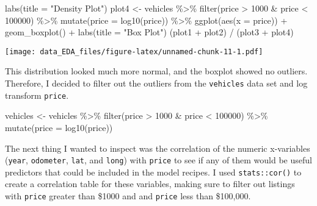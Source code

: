 \documentclass[
]{article}
\newenvironment{Shaded}{\begin{snugshade}}{\end{snugshade}}
\newcommand{\AttributeTok}[1]{\textcolor[rgb]{0.77,0.63,0.00}{#1}}
\newcommand{\DecValTok}[1]{\textcolor[rgb]{0.00,0.00,0.81}{#1}}
\newcommand{\FunctionTok}[1]{\textcolor[rgb]{0.00,0.00,0.00}{#1}}
\newcommand{\NormalTok}[1]{#1}
\newcommand{\OtherTok}[1]{\textcolor[rgb]{0.56,0.35,0.01}{#1}}
\newcommand{\SpecialCharTok}[1]{\textcolor[rgb]{0.00,0.00,0.00}{#1}}
\newcommand{\StringTok}[1]{\textcolor[rgb]{0.31,0.60,0.02}{#1}}
\begin{document}
\begin{Shaded}
\begin{Highlighting}[]
  \FunctionTok{labs}\NormalTok{(}\AttributeTok{title =} \StringTok{"Density Plot"}\NormalTok{)}
\NormalTok{plot4 }\OtherTok{\textless{}{-}}\NormalTok{ vehicles }\SpecialCharTok{\%\textgreater{}\%} 
  \FunctionTok{filter}\NormalTok{(price }\SpecialCharTok{\textgreater{}} \DecValTok{1000} \SpecialCharTok{\&}\NormalTok{ price }\SpecialCharTok{\textless{}} \DecValTok{100000}\NormalTok{) }\SpecialCharTok{\%\textgreater{}\%} 
  \FunctionTok{mutate}\NormalTok{(}\AttributeTok{price =} \FunctionTok{log10}\NormalTok{(price)) }\SpecialCharTok{\%\textgreater{}\%} 
  \FunctionTok{ggplot}\NormalTok{(}\FunctionTok{aes}\NormalTok{(}\AttributeTok{x =}\NormalTok{ price)) }\SpecialCharTok{+} 
  \FunctionTok{geom\_boxplot}\NormalTok{() }\SpecialCharTok{+} 
  \FunctionTok{labs}\NormalTok{(}\AttributeTok{title =} \StringTok{"Box Plot"}\NormalTok{)}
\NormalTok{(plot1 }\SpecialCharTok{+}\NormalTok{ plot2) }\SpecialCharTok{/}\NormalTok{ (plot3 }\SpecialCharTok{+}\NormalTok{ plot4)}
\end{Highlighting}
\end{Shaded}

\texttt{[image: data\_EDA\_files/figure-latex/unnamed-chunk-11-1.pdf]}

This distribution looked much more normal, and the boxplot showed no
outliers. Therefore, I decided to filter out the outliers from the
\texttt{vehicles} data set and log transform \texttt{price}.

\begin{Shaded}
\begin{Highlighting}[]
\NormalTok{vehicles }\OtherTok{\textless{}{-}}\NormalTok{ vehicles }\SpecialCharTok{\%\textgreater{}\%} 
  \FunctionTok{filter}\NormalTok{(price }\SpecialCharTok{\textgreater{}} \DecValTok{1000} \SpecialCharTok{\&}\NormalTok{ price }\SpecialCharTok{\textless{}} \DecValTok{100000}\NormalTok{) }\SpecialCharTok{\%\textgreater{}\%} 
  \FunctionTok{mutate}\NormalTok{(}\AttributeTok{price =} \FunctionTok{log10}\NormalTok{(price))}
\end{Highlighting}
\end{Shaded}

The next thing I wanted to inspect was the correlation of the numeric
x-variables (\texttt{year}, \texttt{odometer}, \texttt{lat}, and
\texttt{long}) with \texttt{price} to see if any of them would be useful
predictors that could be included in the model recipes. I used
\texttt{stats::cor()} to create a correlation table for these variables,
making sure to filter out listings with \texttt{price} greater than
\$1000 and and \texttt{price} less than \$100,000.
\end{document}
